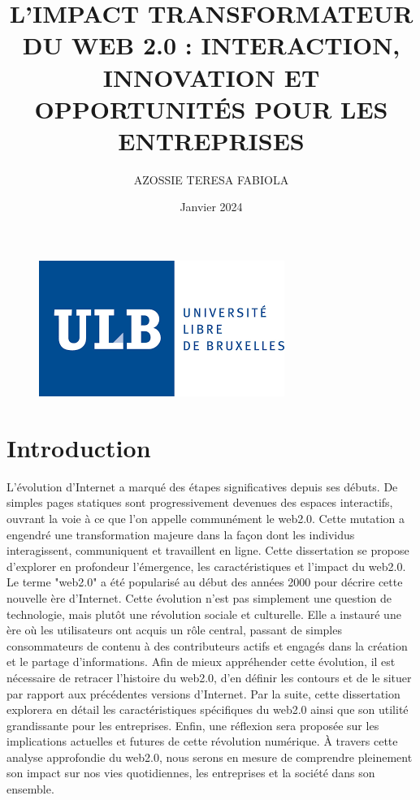 \documentclass[12pt,a4paper]{article} %
\title{\textbf{L’IMPACT TRANSFORMATEUR DU WEB 2.0 : INTERACTION, INNOVATION ET OPPORTUNITÉS POUR LES ENTREPRISES} } %
\author{AZOSSIE TERESA FABIOLA} %
\date{Janvier 2024} %
\begin{document}
	
	\maketitle %
	\begin{figure}[h]
		
		\centering
		
		\includegraphics[scale=1]{ulb-logo}
		
	\end{figure}
	\tableofcontents %
	
	\section{Introduction}
	L'évolution d'Internet a marqué des étapes significatives depuis ses débuts. De simples pages statiques sont progressivement devenues des espaces interactifs, ouvrant la voie à ce que l'on appelle communément le web2.0. Cette mutation a engendré une transformation majeure dans la façon dont les individus interagissent, communiquent et travaillent en ligne. Cette dissertation se propose d'explorer en profondeur l'émergence, les caractéristiques et l'impact du web2.0. Le terme "web2.0" a été popularisé au début des années 2000 pour décrire cette nouvelle ère d'Internet. Cette évolution n'est pas simplement une question de technologie, mais plutôt une révolution sociale et culturelle. Elle a instauré une ère où les utilisateurs ont acquis un rôle central, passant de simples consommateurs de contenu à des contributeurs actifs et engagés dans la création et le partage d'informations. Afin de mieux appréhender cette évolution, il est nécessaire de retracer l'histoire du web2.0, d'en définir les contours et de le situer par rapport aux précédentes versions d'Internet. Par la suite, cette dissertation explorera en détail les caractéristiques spécifiques du web2.0 ainsi que son utilité grandissante pour les entreprises. Enfin, une réflexion sera proposée sur les implications actuelles et futures de cette révolution numérique. À travers cette analyse approfondie du web2.0, nous serons en mesure de comprendre pleinement son impact sur nos vies quotidiennes, les entreprises et la société dans son ensemble.
\end{document}
